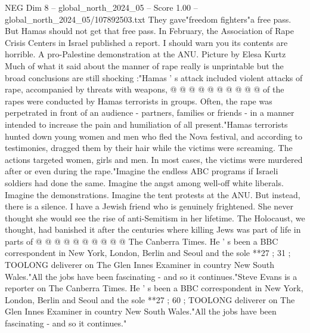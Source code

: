 \begin{textsample}{NEG Dim 8 – global\_north\_2024\_05 – Score 1.00 – global\_north\_2024\_05/107892503.txt}
They gave"freedom fighters"a free pass.
But Hamas should not get that free pass.
In February, the Association of Rape Crisis Centers in Israel published a report.
I should warn you its contents are horrible.
A pro-Palestine demonstration at the ANU.
Picture by Elesa Kurtz Much of what it said about the manner of rape really is unprintable but the broad conclusions are still shocking :"Hamas ' s attack included violent attacks of rape, accompanied by threats with weapons, @ @ @ @ @ @ @ @ @ @ of the rapes were conducted by Hamas terrorists in groups.
Often, the rape was perpetrated in front of an audience - partners, families or friends - in a manner intended to increase the pain and humiliation of all present."Hamas terrorists hunted down young women and men who fled the Nova festival, and according to testimonies, dragged them by their hair while the victims were screaming.
The actions targeted women, girls and men.
In most cases, the victims were murdered after or even during the rape."Imagine the endless ABC programs if Israeli soldiers had done the same.
Imagine the angst among well-off white liberals.
Imagine the demonstrations.
Imagine the tent protests at the ANU.
But instead, there is a silence.
I have a Jewish friend who is genuinely frightened.
She never thought she would see the rise of anti-Semitism in her lifetime.
The Holocaust, we thought, had banished it after the centuries where killing Jews was part of life in parts of @ @ @ @ @ @ @ @ @ @ The Canberra Times.
He ' s been a BBC correspondent in New York, London, Berlin and Seoul and the sole **27 ; 31 ; TOOLONG deliverer on The Glen Innes Examiner in country New South Wales."All the jobs have been fascinating - and so it continues."Steve Evans is a reporter on The Canberra Times.
He ' s been a BBC correspondent in New York, London, Berlin and Seoul and the sole **27 ; 60 ; TOOLONG deliverer on The Glen Innes Examiner in country New South Wales."All the jobs have been fascinating - and so it continues."

\end{textsample}
